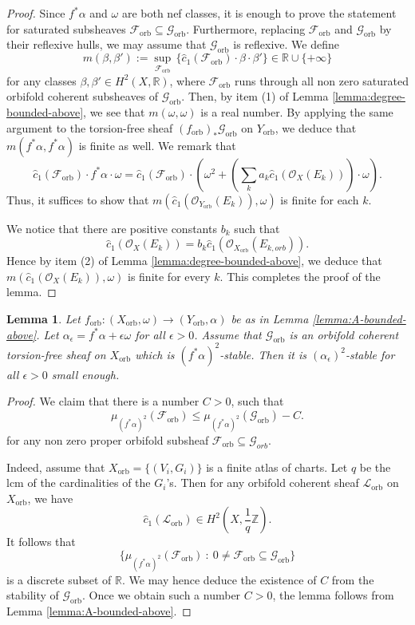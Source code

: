 \documentclass[12pt]{amsart}
\newcommand{\<}{\leq}
\def\mcO{\mathcal{O}}
\def\mcF{\mathcal{F}}
\def\mcG{\mathcal{G}}
\def\mcL{\mathcal{L}}
\newtheorem{lemma}[theorem]{Lemma}
\theoremstyle{remark}
\theoremstyle{definition}
\theoremstyle{definition}
\numberwithin{equation}{section}
\theoremstyle{definition}
\theoremstyle{definition}
\def\orb{\mathrm{orb}}
\begin{document}
\begin{proof}
Since $f^*\alpha$ and $\omega$ are both nef classes, it is enough to prove the statement for  saturated subsheaves $\mcF_{\orb} \subseteq \mcG_{\orb}$. 
Furthermore, replacing $\mcF_{\orb}$ and $\mcG_{\orb}$ by their reflexive hulls, we may assume that $\mcG_\orb$ is reflexive. 
We define 
\[ m(\beta, \beta'):= \sup_{\mcF_{\orb}} \,  \{ \hat{c}_1(\mcF_{\orb}) \cdot \beta \cdot \beta'  \} \in \mathbb{R} \cup \{+\infty\}\]
for any classes $\beta, \beta' \in H^2(X, \mathbb{R})$, where $\mcF_{\orb}$ runs through all non zero saturated orbifold coherent subsheaves of $\mcG_{\orb}$. 
Then, by item (1) of Lemma \ref{lemma:degree-bounded-above}, we see  that $m(\omega, \omega)$ is a real number. 
By applying the same argument to the torsion-free sheaf 
$(f_{\orb})_*\mcG_{\orb}$ on $Y_{\orb}$, we deduce that $m(f^*\alpha, f^*\alpha)$ is finite as well. 
We remark that 
\[
\hat{c}_1(\mcF_{\orb}) \cdot f^*\alpha \cdot \omega =
\hat{c}_1(\mcF_{\orb}) \cdot  (\omega^2 + (\sum_k a_k \hat{c}_1( \mcO_{X}(E_k))) \cdot \omega).
\]
Thus, it suffices to show that  $m(   \hat{c}_1( \mcO_{Y_{\orb}}(E_k)), \omega)$ is finite for each $k$. 
 

We notice that there are positive constants $b_k$ such that 
\[\hat{c}_1(  \mcO_{X}(E_k) ) = b_k \hat{c}_1 ( \mcO_{X_{\orb}}(E_{k,orb}) ).\] 
Hence by item (2) of Lemma \ref{lemma:degree-bounded-above}, we deduce that $m(  \hat{c}_1( \mcO_X(E_k)), \omega)$ is finite for every $k$.  
This completes the proof of the lemma. 
\end{proof} 



\begin{lemma}
\label{lemma:A-perturbation-stability}
Let $f_{\orb}\colon (X_{\orb}, \omega)  \to (Y_{\orb},\alpha)$ be as in Lemma \ref{lemma:A-bounded-above}. 
Let $\alpha_\epsilon= f^*\alpha+\epsilon \omega$ for all $\epsilon >0$. 
Assume that $\mcG_{\orb}$ is an orbifold coherent torsion-free sheaf on $X_{\orb}$ which  is $(f^*\alpha)^2$-stable.
Then  it  is $(\alpha_\epsilon)^{2}$-stable for all $\epsilon>0$ small enough.
\end{lemma}
     

\begin{proof}  
We claim that there is a number $C>0$, such that 
\[
\mu_{(f^*\alpha)^2}(\mcF_{\orb}) \< \mu_{(f^*\alpha)^2}(\mcG_{\orb}) - C. 
\]
for any non zero proper orbifold subsheaf
$\mcF_{\orb} \subseteq \mcG_{orb}$.

Indeed, assume that $X_{\orb}= \{( V_i, G_i)\}$ is a finite atlas of charts. 
Let $q$ be the lcm of the cardinalities of the $G_i$'s. 
Then for any orbifold coherent sheaf $\mcL_{\orb}$ on $X_{\orb}$,  we have
\[
\hat{c}_1(\mcL_{\orb}) \in H^2(X, \frac{1}{q}\mathbb{Z}). 
\]
It follows that 
\[\{\mu_{(f^*\alpha)^2}(\mcF_{\orb}) \ : \ 0\neq  \mcF_{\orb}  \subseteq \mcG_{\orb} \}\]
is a discrete subset of $\mathbb{R}$. 
We may hence deduce the existence of $C$  from the stability of $\mcG_{\orb}$. 
Once we obtain such a number $C>0$,   the lemma   follows from Lemma \ref{lemma:A-bounded-above}.
\end{proof}
\end{document}
